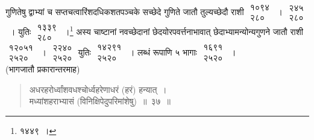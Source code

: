 \documentclass[10pt, openany]{book}
\begin{document}
{गुणितेषु द्वाभ्यां च सप्तचत्वारिंशदधिकशतपञ्चके सच्छेदे गुणिते जातौ
तुल्यच्छेदौ राशी $\begin{matrix}

\mbox{{१०९४}}\\

\mbox{{२८०}}

\end{matrix}$~। $\begin{matrix}

\mbox{{२४५}}\\

\mbox{{२८०}}

\end{matrix}$~। युतिः $\begin{matrix}

\mbox{{१३३९}}\\

\mbox{{२८०}}

\end{matrix}$~।\renewcommand{\thefootnote}{\s ४}\footnote{\s १४४९~।} अस्य चाष्टानां
नवच्छेदानां छेदयोरपवर्त्तनाभावात् छेदाभ्यामन्योन्यगुणने जातौ राशी $\begin{matrix}

\mbox{{१२०५१}}\\

\mbox{{२५२०}}

\end{matrix}$~। $\begin{matrix}

\mbox{{२२४०}}\\

\mbox{{२५२०}}

\end{matrix}$ युतिः $\begin{matrix}

\mbox{{१४२९१}}\\

\mbox{{२५२०}}

\end{matrix}$~। लब्धं रूपाणि ५ भागाः} $\begin{matrix}

\mbox{{१६९१}}\\

\mbox{{२५२०}}

\end{matrix}$~। \\

{(भागजातौ प्रकारान्तरमाह\textemdash)}

\begin{quote}
{\bs अधरहरोर्ध्वांशवधश्चोर्ध्वहरेणाधरं (हरं) हन्यात्~। \\
 मध्यांशहराभ्यासं (विनिक्षिपेदुपरिमांशेषु)~॥~३७~॥}\end{quote}
\end{document}
